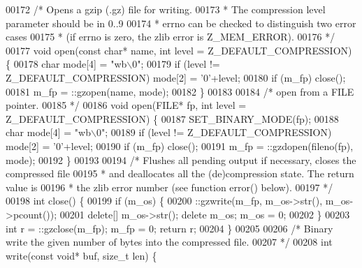 \begin{DoxyCode}
00172         \textcolor{comment}{/* Opens a gzip (.gz) file for writing.}
00173 \textcolor{comment}{         * The compression level parameter should be in 0..9}
00174 \textcolor{comment}{         * errno can be checked to distinguish two error cases}
00175 \textcolor{comment}{         * (if errno is zero, the zlib error is Z\_MEM\_ERROR).}
00176 \textcolor{comment}{         */}
00177         \textcolor{keywordtype}{void} open(\textcolor{keyword}{const} \textcolor{keywordtype}{char}* name, \textcolor{keywordtype}{int} level = Z\_DEFAULT\_COMPRESSION) \{
00178             \textcolor{keywordtype}{char} mode[4] = \textcolor{stringliteral}{"wb\(\backslash\)0"};
00179             \textcolor{keywordflow}{if} (level != Z\_DEFAULT\_COMPRESSION) mode[2] = \textcolor{charliteral}{'0'}+level;
00180             \textcolor{keywordflow}{if} (m\_fp) close();
00181             m\_fp = ::gzopen(name, mode);
00182         \}
00183 
00184         \textcolor{comment}{/* open from a FILE pointer.}
00185 \textcolor{comment}{         */}
00186         \textcolor{keywordtype}{void} open(FILE* fp, \textcolor{keywordtype}{int} level = Z\_DEFAULT\_COMPRESSION) \{
00187             SET\_BINARY\_MODE(fp);
00188             \textcolor{keywordtype}{char} mode[4] = \textcolor{stringliteral}{"wb\(\backslash\)0"};
00189             \textcolor{keywordflow}{if} (level != Z\_DEFAULT\_COMPRESSION) mode[2] = \textcolor{charliteral}{'0'}+level;
00190             \textcolor{keywordflow}{if} (m\_fp) close();
00191             m\_fp = ::gzdopen(fileno(fp), mode);
00192         \}
00193 
00194         \textcolor{comment}{/* Flushes all pending output if necessary, closes the compressed file}
00195 \textcolor{comment}{         * and deallocates all the (de)compression state. The return value is}
00196 \textcolor{comment}{         * the zlib error number (see function error() below).}
00197 \textcolor{comment}{         */}
00198         \textcolor{keywordtype}{int} close() \{
00199             \textcolor{keywordflow}{if} (m\_os) \{
00200                 ::gzwrite(m\_fp, m\_os->str(), m\_os->pcount());
00201                 \textcolor{keyword}{delete}[] m\_os->str(); \textcolor{keyword}{delete} m\_os; m\_os = 0;
00202             \}
00203             \textcolor{keywordtype}{int} r = ::gzclose(m\_fp); m\_fp = 0; \textcolor{keywordflow}{return} r;
00204         \}
00205 
00206         \textcolor{comment}{/* Binary write the given number of bytes into the compressed file.}
00207 \textcolor{comment}{         */}
00208         \textcolor{keywordtype}{int} write(\textcolor{keyword}{const} \textcolor{keywordtype}{void}* buf, \textcolor{keywordtype}{size\_t} len) \{

\end{DoxyCode}
